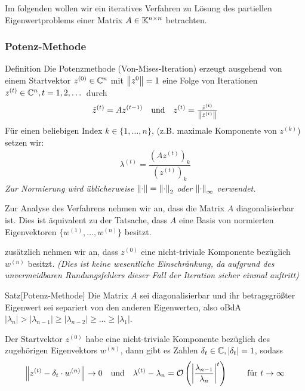Im folgenden wollen wir ein iteratives Verfahren zu Lösung des partiellen Eigenwertproblems einer 
Matrix $A\in\mathbb K^{n\times n}$ betrachten.

\subsubsection{Potenz-Methode}

\begin{colbox}{Definition}
  Die Potenzmethode (Von-Mises-Iteration) erzeugt ausgehend von einem Startvektor $z^{(0)}\in\mathbb C^n$ mit
  $\vertn{2}{z^0}=1$ eine Folge von Iterationen $z^{(t)}\in\mathbb C^n, t=1,2,\dots$ durch 
  \begin{align*}
    \tilde{z}^{(t)} 
    = Az^{(t-1)} 
    \quad\text{und}\quad 
    z^{(t)} 
    = \tfrac{\tilde{z}^{(t)}}{\vertn{2}{\tilde{z}^{(t)}}}
  \end{align*}
  Für einen beliebigen  Index $k\in\{1,\dots,n\}$, (z.B. maximale Komponente von $z^{(k)}$) setzen wir:
  \begin{align*}
    \lambda^{(t)} 
    = \dfrac{(Az^{(t)})_k}{(z^{(t)})_k}
  \end{align*}
  \textit{Zur Normierung wird üblicherweise $\vertn{2}{\cdot}=\vertn{2}{\cdot}_2$ oder $\vertn{2}{\cdot}_\infty$ verwendet.} 
\end{colbox}

Zur Analyse des Verfahrens nehmen wir an, dass die Matrix $A$ diagonalisierbar ist. 
Dies ist äquivalent zu der Tatsache, dass $A$ eine Basis von normierten Eigenvektoren 
$\{w^{(1)},\dots,w^{(n)}\}$ besitzt. 

zusätzlich nehmen wir an, dass $z^{(0)}$ eine nicht-triviale Komponente bezüglich $w^{(n)}$ besitzt. 
\textit{(Dies ist keine wesentliche Einschränkung, da aufgrund des unvermeidbaren Rundungsfehlers dieser Fall der 
Iteration sicher einmal auftritt)}

\begin{colbox}{Satz}[Potenz-Methode]
  Die Matrix $A$ sei diagonalisierbar und ihr betragsgrößter Eigenwert sei separiert von den anderen 
  Eigenwerten, also oBdA $|\lambda_n|>|\lambda_{n-1}|\geq|\lambda_{n-2}|\geq\dots\geq|\lambda_1|$. 

  Der Startvektor $z^{(0)}$ habe eine nicht-triviale Komponente bezüglich des zugehörigen Eigenvektors $w^{(n)}$,
  dann gibt es Zahlen $\delta_t\in\mathbb C, |\delta_t|=1$, 
  sodass 
  \begin{align*}
    \vertn{2}{z^{(t)}-\delta_t\cdot w^{(n)}}\rightarrow 0
    \quad \text{und}\quad 
    \lambda^{(t)}-\lambda_n = \mathcal{O}\left(\left|\dfrac{\lambda_{n-1}}{\lambda_n}\right|^t\right)
    \qquad 
    \text{ für } t\rightarrow \infty\end{align*}
\end{colbox}

